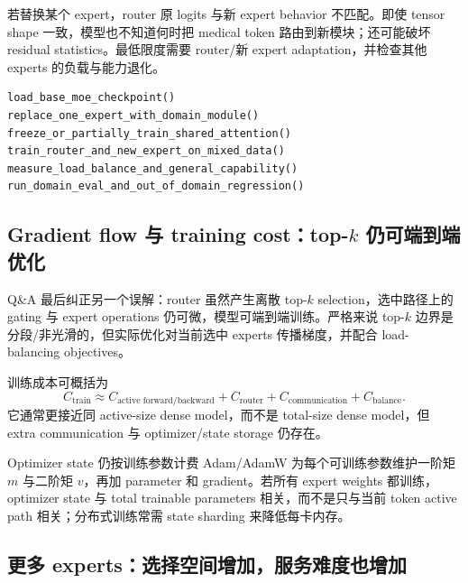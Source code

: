 若替换某个 expert，router 原 logits 与新 expert behavior 不匹配。即使 tensor shape 一致，模型也不知道何时把 medical token 路由到新模块；还可能破坏 residual statistics。最低限度需要 router/新 expert adaptation，并检查其他 experts 的负载与能力退化。

\begin{lstlisting}[caption={替换 expert 后的最小验证流程}]
load_base_moe_checkpoint()
replace_one_expert_with_domain_module()
freeze_or_partially_train_shared_attention()
train_router_and_new_expert_on_mixed_data()
measure_load_balance_and_general_capability()
run_domain_eval_and_out_of_domain_regression()
\end{lstlisting}


\subsection{Gradient flow 与 training cost：\texorpdfstring{top-$k$}{top-k} 仍可端到端优化}

Q\&A 最后纠正另一个误解：router 虽然产生离散 top-$k$ selection，选中路径上的 gating 与 expert operations 仍可微，模型可端到端训练。严格来说 top-$k$ 边界是分段/非光滑的，但实际优化对当前选中 experts 传播梯度，并配合 load-balancing objectives。

训练成本可概括为
\[
C_{\text{train}}\approx C_{\text{active forward/backward}}+C_{\text{router}}+C_{\text{communication}}+C_{\text{balance}}.
\]
它通常更接近同 active-size dense model，而不是 total-size dense model，但 extra communication 与 optimizer/state storage 仍存在。

\begin{knowledgebox}{Optimizer state 仍按训练参数计费}
Adam/AdamW 为每个可训练参数维护一阶矩 $m$ 与二阶矩 $v$，再加 parameter 和 gradient。若所有 expert weights 都训练，optimizer state 与 total trainable parameters 相关，而不是只与当前 token active path 相关；分布式训练常需 state sharding 来降低每卡内存。
\end{knowledgebox}


\subsection{更多 experts：选择空间增加，服务难度也增加}

